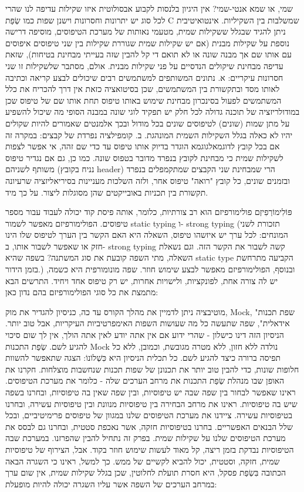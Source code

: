 \begin{טבלא}[!htbp]
      שמי, או שמא אנטי-שמי?
      אין היגיון בלנסות לקבוע אבסולוטית איזו שקילות עדיפה לנו שהרי לכל סוג יש יתרונות וחסרונות וישנן שפות כמו שְׂפַת C שמשלבות בין השקיליות. אינטואיטיבית ניתן להגיד שבגלל ששקילות שמית, מטעמי נאותות של מערכת הטיפוסים, מוסיפה דרישה נוספת על שקילות מבנית (אם יש שקילות שמית שגוררת שקילות בין שני טיפוסים איפוסים עם אותו שם אך מבנה שונה או לא תואם די קל להבין שזה בעייתי מבחינת בטיחות), שזאת עדיפה מבחינת שיקולים הנדסיים על פני שקילות מבנית. אולם, מסתבר שלשקילות זו שני חסרונות עיקריים:
      א. נתונים המשותפים למשתמשים רבים שיכולים לבצע קריאה וכתיבה לאותו מסד ובתקשורת בין המשתמשים, שכן בסיטואציה כזאת אין דרך להכריח את כלל המשתמשים לפעול בסינכרון מבחינת שימוש באותו טיפוס תחת אותו שם של טיפוס שכן במודולריזציה של תוכנה גדולה לכל חלק יש תפקיד לוגי שונה במבנה הסופי מה שיכול להשפיע על מתן שמות (שונים) לטיפוסים שונים בכל מודול ובכך אלמנטים שאמורים להיות שקולים יהיו לא כאלה בגלל השקילות השמית המונהגת.
      ב. קומפילציה נפרדת של קבצים: במקרה זה אם בכל קובץ לדוגמאלגוגמא הוגדר בדיוק אותו טיפוס עד כדי שם זהה, אי אפשר לצפות לשקילות שמית כי מבחינת לקובץ בנפרד מדובר בטפוס שונה. כמו כן, גם אם נגדיר טיפוס משותף לשניהם (נניח בקובץ header) הרי שמבחינת שני הקבצים שמתקמפלים בנפרד ובזמנים שונים, כל קובץ "רואה" טיפוס אחר, ולזה השלכות מעניינות בסיריאליזציה שרעיונה תקשורת בין תכניות באובייקטים שהן מסוגלות ליצור. על כך מיד.

      פּוֹלִימוֹרְפִיזְם
      פולימורפיזם הוא רב צורתיות, כלומר, אותה פיסת קוד יכולה לעבוד עבור מספר טיפוסים. הפולימורפיזם מאפשר לשמור static typing ו- strong typing (תזכורת לשני המונחים: לכל ערך יש איזשהו טיפוס, השאלה היא האם הקשר בין הערך לטיפוס שלו הינו חזק או שאפשר לשבור אותו, ב- strong typing קשה לשבור את הקשר הזה. וגם נשאלת השאלה, מתי השפה קובעת את סוג המשתנה? בשפה שהיא static type הקביעה מתרחשת בזמן הידור.) ובנוסף, הפולימורפיזם מאפשר לבצע שימוש חוזר. שפה מונומורפית היא כשמה, יש לה צורה אחת, לפונקציות, ולישויות אחרות, יש רק טיפוס אחד ויחיד.
      התרשים הבא מתמצת את כל סוגי הפולימורפיזם בהם נדון כאן:

      מוטיבציה
      ניתן לדמיין את מהלך הקורס עד כה, כניסיון להגדיר את מוק, Mock, "שפת תכנות אידאלית", שפה שתעשה כל מה שעושות השפות האימפרטיביות העיקריות, אבל טוב יותר. הניסיון הזה דינו כישלון - שהרי ידוע אם אין אתה יודע לאין אתה הולך, אין לך שום סיכוי להגיע לשם. שְׂפַת התכנות Mock נולדה ללא חזון, ללא מטרה מגובשת, וכמובן, ללא כל תפיסה ברורה כיצד להגיע לשם. כל תכלית הניסיון היא כִּשְׁלוֹנוֹ: הצגה שתאפשר להשוות חלופות שונות, כדי להבין טוב יותר את תכנונן של שפות תכנות שנחשבות מוצלחות.
      חקרנו את האופן שבו מנהלת שְׂפַת התכנות את מרחב הערכים שלה - כלומר את מערכת הטיפוסים. ראינו שאפשר לבחור בין שפה שבה יש טיפוסיות, ובין שפה שאין בה טיפוסיות, ובחרנו בשפה שיש בה טיפוסיות. ראינו את מרחב הבחירה בין טיפוסיות מנוונת ובין טיפוסיות עשירה, ובחרנו בטיפוסיות עשירה. ציידנו את מערכת הטיפוסים שלנו במגוון של טיפוסים פרימיטיביים, ובכל שלל הבנאים האפשריים. בחרנו בטיפוסיות חזקה, אשר נאכפת סטטית, ובחרנו גם לבסס את מערכת הטיפוסים שלנו על שקילות שמית.
      בפרק זה נתחיל להבין שהפרזנו. במערכת שבה הטיפוסיות נבדקת בזמן ריצה, קל מאוד לעשות שימוש חוזר בקוד. אבל, הצירוף של טיפוסיות שמית, חזקה, וסטטית, יכול להביא לקשיים של ממש. כך למשל, ראינו כי השגרה הבאה הכתובה בִּשְׂפַת פסקל, היא חסרת תועלת לחלוטין, שכן בגלל שקילות שמית, אין שום ערך במרחב הערכים של השפה אשר עליו השגרה יכולה להיות מופעלת:


\end{טבלא}
